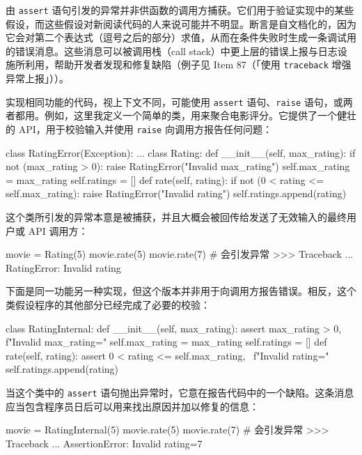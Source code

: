 由 \texttt{assert} 语句引发的异常并非供函数的调用方捕获。它们用于验证实现中的某些假设，而这些假设对新阅读代码的人来说可能并不明显。断言是自文档化的，因为它会对第二个表达式（逗号之后的部分）求值，从而在条件失败时生成一条调试用的错误消息。这些消息可以被调用栈（call stack）中更上层的错误上报与日志设施所利用，帮助开发者发现和修复缺陷（例子见 Item 87（「使用 \texttt{traceback} 增强异常上报」））。

实现相同功能的代码，视上下文不同，可能使用 \texttt{assert} 语句、\texttt{raise} 语句，或两者都用。例如，这里我定义一个简单的类，用来聚合电影评分。它提供了一个健壮的 API，用于校验输入并使用 \texttt{raise} 向调用方报告任何问题：

\begin{codebox}[python]
class RatingError(Exception):
    ...
class Rating:
    def __init__(self, max_rating):
        if not (max_rating > 0):
            raise RatingError("Invalid max_rating")
        self.max_rating = max_rating
        self.ratings = []
    def rate(self, rating):
        if not (0 < rating <= self.max_rating):
            raise RatingError("Invalid rating")
        self.ratings.append(rating)
\end{codebox}

这个类所引发的异常本意是被捕获，并且大概会被回传给发送了无效输入的最终用户或 API 调用方：

\begin{codebox}[python]
movie = Rating(5)
movie.rate(5)
movie.rate(7)  # 会引发异常
>>>
Traceback ...
RatingError: Invalid rating
\end{codebox}

下面是同一功能另一种实现，但这个版本并非用于向调用方报告错误。相反，这个类假设程序的其他部分已经完成了必要的校验：

\begin{codebox}[python]
class RatingInternal:
    def __init__(self, max_rating):
        assert max_rating > 0, f"Invalid {max_rating=}"
        self.max_rating = max_rating
        self.ratings = []
    def rate(self, rating):
         assert 0 < rating <= self.max_rating, \
    f"Invalid {rating=}"
        self.ratings.append(rating)
\end{codebox}

当这个类中的 \texttt{assert} 语句抛出异常时，它意在报告代码中的一个缺陷。这条消息应当包含程序员日后可以用来找出原因并加以修复的信息：

\begin{codebox}[python]
movie = RatingInternal(5)
movie.rate(5)
movie.rate(7)  # 会引发异常
>>>
Traceback ...
AssertionError: Invalid rating=7
\end{codebox}


